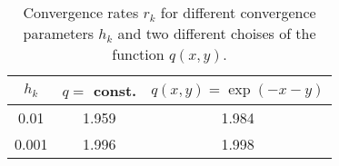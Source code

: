 \documentclass[twoside]{article}
\begin{document}
  \begin{table} \label{tab:conv}
    \begin{center}
      \caption{Convergence rates $r_{k}$ for different convergence parameters $h_{k}$ and two different choises of the function $q(x, y)$.}
      \begin{tabular}{ccc}
        \hline\hline
        $h_{k}$ & $q = $ const. & $q(x, y) = \exp(-x-y)$ \\
        \hline
        0.01 & 1.959 & 1.984 \\
        0.001 & 1.996 & 1.998 \\
        \hline\hline

      \end{tabular}
    \end{center}
  \end{table}






















\end{document}
